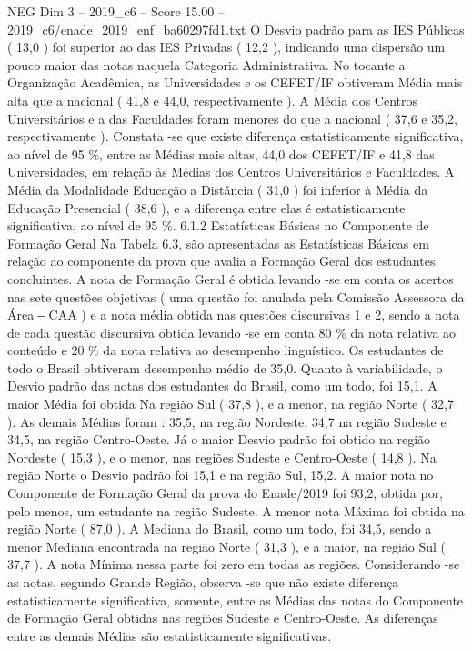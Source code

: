 \begin{textsample}{NEG Dim 3 – 2019\_c6 – Score 15.00 – 2019\_c6/enade\_2019\_enf\_ba60297fd1.txt}
O Desvio padrão para as IES Públicas ( 13,0 ) foi superior ao das IES Privadas ( 12,2 ), indicando uma dispersão um pouco maior das notas naquela Categoria Administrativa.
No tocante a Organização Acadêmica, as Universidades e os CEFET/IF obtiveram Média mais alta que a nacional ( 41,8 e 44,0, respectivamente ).
A Média dos Centros Universitários e a das Faculdades foram menores do que a nacional ( 37,6 e 35,2, respectivamente ).
Constata -se que existe diferença estatisticamente significativa, ao nível de 95 \%, entre as Médias mais altas, 44,0 dos CEFET/IF e 41,8 das Universidades, em relação às Médias dos Centros Universitários e Faculdades.
A Média da Modalidade Educação a Distância ( 31,0 ) foi inferior à Média da Educação Presencial ( 38,6 ), e a diferença entre elas é estatisticamente significativa, ao nível de 95 \%. 6.1.2 Estatísticas Básicas no Componente de Formação Geral Na Tabela 6.3, são apresentadas as Estatísticas Básicas em relação ao componente da prova que avalia a Formação Geral dos estudantes concluintes.
A nota de Formação Geral é obtida levando -se em conta os acertos nas sete questões objetivas ( uma questão foi anulada pela Comissão Assessora da Área ‒ CAA ) e a nota média obtida nas questões discursivas 1 e 2, sendo a nota de cada questão discursiva obtida levando -se em conta 80 \% da nota relativa ao conteúdo e 20 \% da nota relativa ao desempenho linguístico.
Os estudantes de todo o Brasil obtiveram desempenho médio de 35,0.
Quanto à variabilidade, o Desvio padrão das notas dos estudantes do Brasil, como um todo, foi 15,1.
A maior Média foi obtida Na região Sul ( 37,8 ), e a menor, na região Norte ( 32,7 ).
As demais Médias foram : 35,5, na região Nordeste, 34,7 na região Sudeste e 34,5, na região Centro-Oeste.
Já o maior Desvio padrão foi obtido na região Nordeste ( 15,3 ), e o menor, nas regiões Sudeste e Centro-Oeste ( 14,8 ).
Na região Norte o Desvio padrão foi 15,1 e na região Sul, 15,2.
A maior nota no Componente de Formação Geral da prova do Enade/2019 foi 93,2, obtida por, pelo menos, um estudante na região Sudeste.
A menor nota Máxima foi obtida na região Norte ( 87,0 ).
A Mediana do Brasil, como um todo, foi 34,5, sendo a menor Mediana encontrada na região Norte ( 31,3 ), e a maior, na região Sul ( 37,7 ).
A nota Mínima nessa parte foi zero em todas as regiões.
Considerando -se as notas, segundo Grande Região, observa -se que não existe diferença estatisticamente significativa, somente, entre as Médias das notas do Componente de Formação Geral obtidas nas regiões Sudeste e Centro-Oeste.
As diferenças entre as demais Médias são estatisticamente significativas.

\end{textsample}
